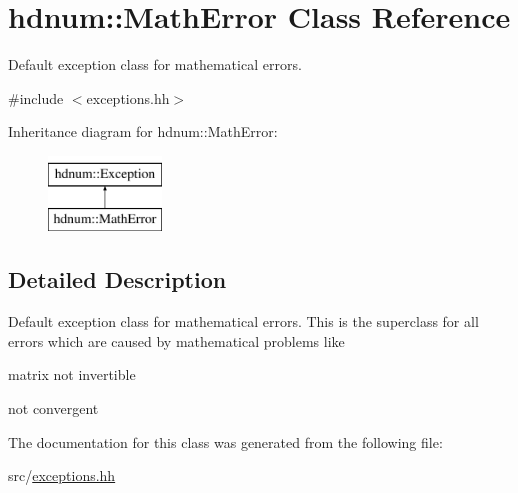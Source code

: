 \hypertarget{classhdnum_1_1MathError}{
\section{hdnum::MathError Class Reference}
\label{classhdnum_1_1MathError}
}


Default exception class for mathematical errors.  




{\ttfamily \#include $<$exceptions.hh$>$}

Inheritance diagram for hdnum::MathError:\begin{figure}[H]
\begin{center}
\leavevmode
\includegraphics[height=2cm]{classhdnum_1_1MathError}
\end{center}
\end{figure}


\subsection{Detailed Description}
Default exception class for mathematical errors. This is the superclass for all errors which are caused by mathematical problems like


\begin{DoxyItemize}
\item matrix not invertible
\item not convergent 
\end{DoxyItemize}

The documentation for this class was generated from the following file:\begin{DoxyCompactItemize}
\item 
src/\hyperlink{exceptions_8hh}{exceptions.hh}\end{DoxyCompactItemize}
